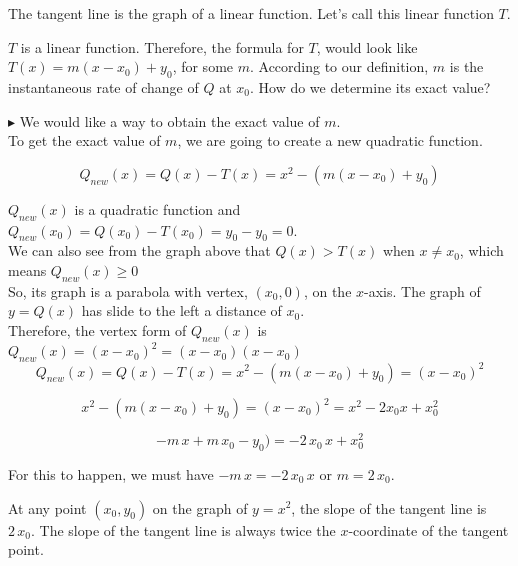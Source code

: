 \documentclass{ximera}
\begin{document}
The tangent line is the graph of a linear function. Let's call this linear function $T$.


$T$ is a linear function. Therefore, the formula for $T$, would look like $T(x) = m(x - x_0) + y_0$, for some $m$.  According to our definition, $m$ is the instantaneous rate of change of $Q$ at $x_0$.  How do we determine its exact value?


$\blacktriangleright$ We would like a way to obtain the exact value of $m$. \\



To get the exact value of $m$, we are going to create a new quadratic function.



\begin{explanation}


\[
Q_{new}(x) = Q(x) - T(x) = x^2 - (m(x - x_0) + y_0)
\]



$Q_{new}(x)$ is a quadratic function and $Q_{new}(x_0) = Q(x_0) - T(x_0) = y_0 - y_0 = 0$. \\

We can also see from the graph above that $Q(x) > T(x)$ when $x \ne x_0$, which means $Q_{new}(x) \geq 0$\\


So, its graph is a parabola with vertex, $(x_0, 0)$, on the $x$-axis.  The graph of $y = Q(x)$ has slide to the left a distance of $x_0$.  \\


Therefore, the vertex form of $Q_{new}(x)$ is $Q_{new}(x) = (x - x_0)^2 = (x - x_0)(x - x_0)$  \\






\[
Q_{new}(x) = Q(x) - T(x) = x^2 - (m(x - x_0) + y_0) = (x - x_0)^2
\]




\[
x^2 - (m(x - x_0) + y_0) = (x - x_0)^2 = x^2 - 2 x_0 x + x_0^2
\]



\[
 -m \, x + m \, x_0 - y_0) =   - 2 \, x_0 \, x + x_0^2
\]


For this to happen, we must have $-m \, x = - 2 \, x_0 \, x$ or $m = 2 \, x_0$. \\


\end{explanation}


At any point $(x_0, y_0)$ on the graph of $y = x^2$, the slope of the tangent line is $2 \, x_0$.  The slope of the tangent line is always twice the $x$-coordinate of the tangent point.
\end{document}
